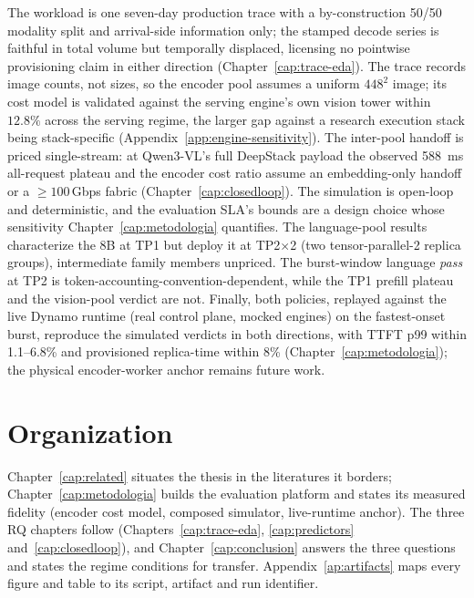 The workload is one seven-day production trace with a by-construction 50/50
modality split and arrival-side information only; the stamped decode series
is faithful in total volume but temporally displaced, licensing no pointwise
provisioning claim in either direction (Chapter~\ref{cap:trace-eda}). The trace records
image counts, not sizes, so the encoder pool assumes a uniform $448^2$
image; its cost model is validated against the serving engine's own vision
tower within $12.8\%$ across the serving regime, the larger gap against a
research execution stack being stack-specific (Appendix~\ref{app:engine-sensitivity}). The inter-pool handoff is priced
single-stream: at Qwen3-VL's full DeepStack payload the observed
\SI{588}{\milli\second} all-request plateau and the encoder cost ratio
assume an embedding-only handoff or a ${\geq}100$\,Gbps fabric
(Chapter~\ref{cap:closedloop}). The simulation is open-loop and
deterministic, and the evaluation SLA's bounds are a design
choice whose sensitivity Chapter~\ref{cap:metodologia} quantifies. The
language-pool results characterize the 8B at TP1 but deploy it at
TP2$\times$2 (two tensor-parallel-2 replica groups), intermediate family
members unpriced. The burst-window
language \emph{pass} at TP2 is token-accounting-convention-dependent, while
the TP1 prefill plateau and the vision-pool verdict are not. Finally, both
policies,
replayed against the live Dynamo runtime (real control plane, mocked
engines) on the fastest-onset burst, reproduce the simulated verdicts in
both directions, with TTFT p99 within 1.1--6.8\% and provisioned
replica-time within 8\% (Chapter~\ref{cap:metodologia}); the physical
encoder-worker anchor remains future work.

\section{Organization}
\label{sec:intro-org}

Chapter~\ref{cap:related} situates the thesis in the literatures it borders;
Chapter~\ref{cap:metodologia} builds the evaluation platform and states its
measured fidelity (encoder cost model, composed simulator, live-runtime
anchor). The three RQ chapters follow (Chapters~\ref{cap:trace-eda},
\ref{cap:predictors} and~\ref{cap:closedloop}), and
Chapter~\ref{cap:conclusion} answers the three questions and states the
regime conditions for transfer. Appendix~\ref{ap:artifacts} maps every
figure and table to its script, artifact and run identifier.
